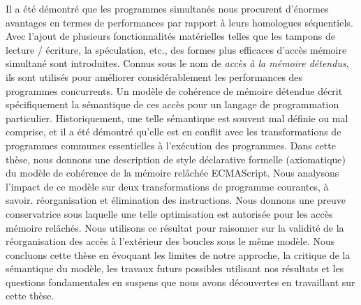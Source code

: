 Il a été démontré que les programmes simultanés nous procurent d'énormes avantages en termes de performances par rapport à leurs homologues séquentiels.
Avec l'ajout de plusieurs fonctionnalités matérielles telles que les tampons de lecture / écriture, la spéculation, etc., des formes plus efficaces d'accès mémoire simultané sont introduites.
Connus sous le nom de \textit{accès à la mémoire détendus}, ils sont utilisés pour améliorer considérablement les performances des programmes concurrents.
Un modèle de cohérence de mémoire détendue décrit spécifiquement la sémantique de ces accès pour un langage de programmation particulier.
Historiquement, une telle sémantique est souvent mal définie ou mal comprise, et il a été démontré qu’elle est en conflit avec les transformations de programmes communes essentielles à l’exécution des programmes.
Dans cette thèse, nous donnons une description de style déclarative formelle (axiomatique) du modèle de cohérence de la mémoire relâchée ECMAScript.
Nous analysons l'impact de ce modèle sur deux transformations de programme courantes, à savoir. réorganisation et élimination des instructions.
Nous donnons une preuve conservatrice sous laquelle une telle optimisation est autorisée pour les accès mémoire relâchés.
Nous utilisons ce résultat pour raisonner sur la validité de la réorganisation des accès à l'extérieur des boucles sous le même modèle.
Nous concluons cette thèse en évoquant les limites de notre approche, la critique de la sémantique du modèle, les travaux futurs possibles utilisant nos résultats et les questions fondamentales en suspens que nous avons découvertes en travaillant sur cette thèse.